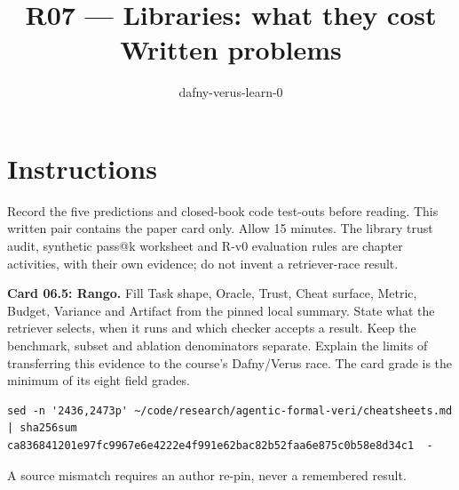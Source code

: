\documentclass[11pt]{article}
\title{R07 --- Libraries: what they cost \\ \large Written problems}
\author{dafny-verus-learn-0}
\date{}
\begin{document}
\maketitle
\section*{Instructions}
Record the five predictions and closed-book code test-outs before reading.
This written pair contains the paper card only. Allow 15 minutes. The library
trust audit, synthetic pass@k worksheet and R-v0 evaluation rules are chapter
activities, with their own evidence; do not invent a retriever-race result.
\begin{problem}\label{prob:B1}
\textbf{Card 06.5: Rango.} Fill Task shape, Oracle, Trust, Cheat surface,
Metric, Budget, Variance and Artifact from the pinned local summary. State
what the retriever selects, when it runs and which checker accepts a result.
Keep the benchmark, subset and ablation denominators separate. Explain the
limits of transferring this evidence to the course's Dafny/Verus race.
The card grade is the minimum of its eight field grades.
\begin{verbatim}
sed -n '2436,2473p' ~/code/research/agentic-formal-veri/cheatsheets.md | sha256sum
ca836841201e97fc9967e6e4222e4f991e62bac82b52faa6e875c0b58e8d34c1  -
\end{verbatim}
A source mismatch requires an author re-pin, never a remembered result.
\end{problem}
\end{document}
